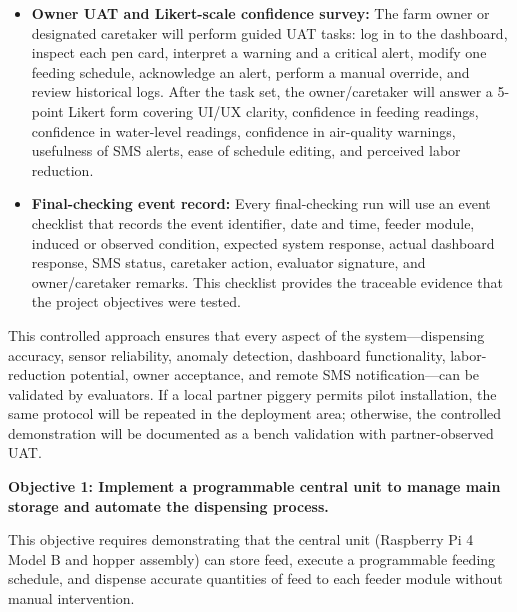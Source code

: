 \begin{itemize}
  \item \textbf{Owner UAT and Likert-scale confidence survey:} The farm owner or designated caretaker will perform guided UAT tasks: log in to the dashboard, inspect each pen card, interpret a warning and a critical alert, modify one feeding schedule, acknowledge an alert, perform a manual override, and review historical logs. After the task set, the owner/caretaker will answer a 5-point Likert form covering UI/UX clarity, confidence in feeding readings, confidence in water-level readings, confidence in air-quality warnings, usefulness of SMS alerts, ease of schedule editing, and perceived labor reduction.
  \item \textbf{Final-checking event record:} Every final-checking run will use an event checklist that records the event identifier, date and time, feeder module, induced or observed condition, expected system response, actual dashboard response, SMS status, caretaker action, evaluator signature, and owner/caretaker remarks. This checklist provides the traceable evidence that the project objectives were tested.
\end{itemize}

This controlled approach ensures that every aspect of the system---dispensing accuracy, sensor reliability, anomaly detection, dashboard functionality, labor-reduction potential, owner acceptance, and remote SMS notification---can be validated by evaluators. If a local partner piggery permits pilot installation, the same protocol will be repeated in the deployment area; otherwise, the controlled demonstration will be documented as a bench validation with partner-observed UAT.

\textbf{Objective 1: Implement a programmable central unit to manage main storage and automate the dispensing process.}

This objective requires demonstrating that the central unit (Raspberry Pi 4 Model B and hopper assembly) can store feed, execute a programmable feeding schedule, and dispense accurate quantities of feed to each feeder module without manual intervention.

